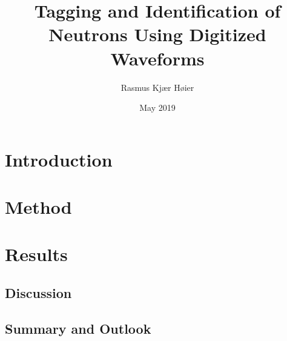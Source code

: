 \documentclass[12pt]{report}
\title{Tagging and Identification of Neutrons Using Digitized Waveforms}
\author{Rasmus Kjær Høier}
\date{May 2019}
\begin{document}

\maketitle

\newpage
\begin{abstract}
\end{abstract}
\newpage
\setcounter{tocdepth}{3}
\tableofcontents
\listoffigures
\listoftables



\newpage
{}
\setcounter{page}{1}
\chapter{Introduction}
\clearpage
\chapter{Method}
\clearpage
\chapter{Results}
\clearpage
\section{Discussion}%
\clearpage
\section{Summary and Outlook}%
\clearpage

\end{document}
